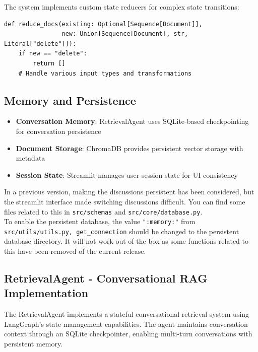 \documentclass[11pt,a4paper]{report}
\begin{document}
The system implements custom state reducers for complex state transitions:

\begin{lstlisting}[caption={Document state reducer}]
def reduce_docs(existing: Optional[Sequence[Document]], 
                new: Union[Sequence[Document], str, Literal["delete"]]):
    if new == "delete":
        return []
    # Handle various input types and transformations
\end{lstlisting}

\subsection{Memory and Persistence}

\begin{itemize}
    \item \textbf{Conversation Memory}: RetrievalAgent uses SQLite-based checkpointing for conversation persistence
    \item \textbf{Document Storage}: ChromaDB provides persistent vector storage with metadata
    \item \textbf{Session State}: Streamlit manages user session state for UI consistency
\end{itemize}

In a previous version, making the discussions persistent has been considered, but the streamlit interface made switching discussions difficult. You can find some files related to this in \texttt{src/schemas} and \texttt{src/core/database.py}.\\
To enable the persistent database, the value \texttt{":memory:"} from \texttt{src/utils/utils.py, get\_connection} should be changed to the persistent database directory. It will not work out of the box as some functions related to this have been removed of the current release.

\subsection{RetrievalAgent - Conversational RAG Implementation}

The RetrievalAgent implements a stateful conversational retrieval system using LangGraph's state management capabilities. The agent maintains conversation context through an SQLite checkpointer, enabling multi-turn conversations with persistent memory.
\end{document}

